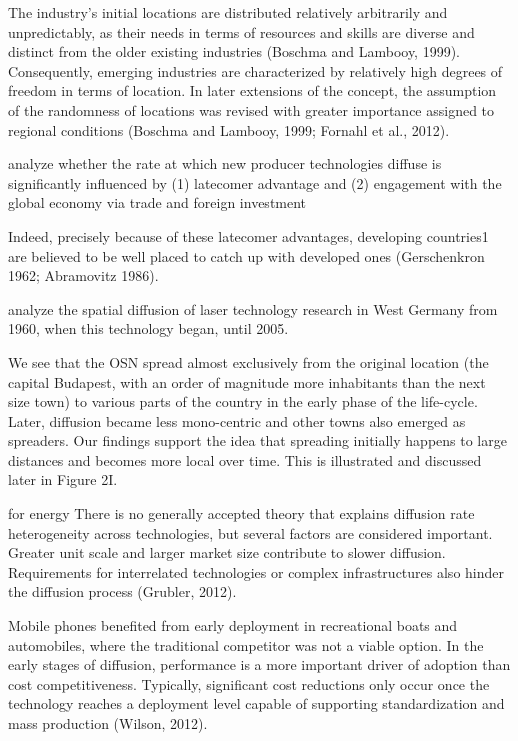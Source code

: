 \documentclass[
  authoryear,
  preprint,
  3p]{elsarticle}
\begin{document}
The industry's initial locations are distributed relatively arbitrarily
and unpredictably, as their needs in terms of resources and skills are
diverse and distinct from the older existing industries (Boschma and
Lambooy, 1999). Consequently, emerging industries are characterized by
relatively high degrees of freedom in terms of location. In later
extensions of the concept, the assumption of the randomness of locations
was revised with greater importance assigned to regional conditions
(Boschma and Lambooy, 1999; Fornahl et al., 2012).

\citet{perkins2005international} analyze whether the rate at which new
producer technologies diffuse is significantly influenced by (1)
latecomer advantage and (2) engagement with the global economy via trade
and foreign investment

Indeed, precisely because of these latecomer advantages, developing
countries1 are believed to be well placed to catch up with developed
ones (Gerschenkron 1962; Abramovitz 1986).

\citet{fritsch2015new} analyze the spatial diffusion of laser technology
research in West Germany from 1960, when this technology began, until
2005.

\citet{perkins2011internet}

\citet{lengyel2020role} We see that the OSN spread almost exclusively
from the original location (the capital Budapest, with an order of
magnitude more inhabitants than the next size town) to various parts of
the country in the early phase of the life-cycle. Later, diffusion
became less mono-centric and other towns also emerged as spreaders. Our
findings support the idea that spreading initially happens to large
distances and becomes more local over time. This is illustrated and
discussed later in Figure 2I.

\citet{PAPAGIANNIDIS2015308}

\citet{leibowicz2016representing} for energy There is no generally
accepted theory that explains diffusion rate heterogeneity across
technologies, but several factors are considered important. Greater unit
scale and larger market size contribute to slower diffusion.
Requirements for interrelated technologies or complex infrastructures
also hinder the diffusion process (Grubler, 2012).

Mobile phones benefited from early deployment in recreational boats and
automobiles, where the traditional competitor was not a viable option.
In the early stages of diffusion, performance is a more important driver
of adoption than cost competitiveness. Typically, significant cost
reductions only occur once the technology reaches a deployment level
capable of supporting standardization and mass production (Wilson,
2012).
\end{document}
